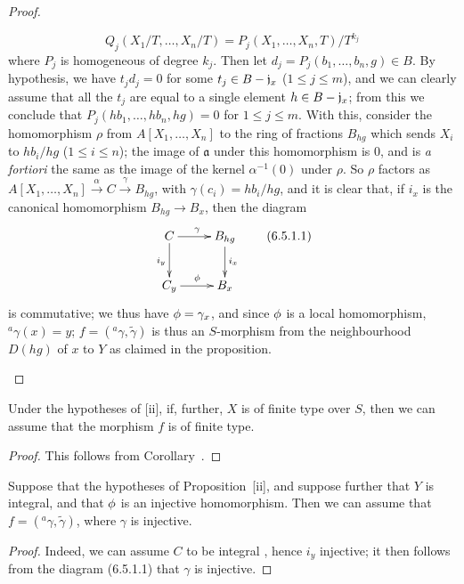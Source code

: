 \begin{proof}
\begin{enumerate}
    \[
      Q_j(X_1/T,\ldots,X_n/T)=P_j(X_1,\ldots,X_n,T)/T^{k_j}
    \]
    where $P_j$ is homogeneous of degree $k_j$.
    Then let $d_j=P_j(b_1,\ldots,b_n,g)\in B$.
    By hypothesis, we have $t_jd_j=0$ for some $t_j\in B-\mathfrak{j}_x$ ($1\leq j\leq m$), and we can clearly assume that all the $t_j$ are equal to a single element $h\in B-\mathfrak{j}_x$;
    from this we conclude that $P_j(hb_1,\ldots,hb_n,hg)=0$ for $1\leq j\leq m$.
    With this, consider the homomorphism $\rho$ from $A[X_1,\ldots,X_n]$ to the ring of fractions $B_{hg}$ which sends $X_i$ to $hb_i/hg$ ($1\leq i\leq n$);
    the image of $\mathfrak{a}$ under this homomorphism is $0$, and is \emph{a fortiori} the same as the image of the kernel $\alpha^{-1}(0)$ under $\rho$.
    So $\rho$ factors as $A[X_1,\ldots,X_n]\xrightarrow{\alpha}C\xrightarrow{\gamma}B_{hg}$, with $\gamma(c_i)=hb_i/hg$, and it is clear that, if $i_x$ is the canonical homomorphism $B_{hg}\to B_x$, then the diagram
    \[
    \label{I.6.5.1.1}
      \xymatrix{
        C\ar[r]^\gamma\ar[d]_{i_y} &
        B_{hg}\ar[d]^{i_x}\\
        C_y\ar[r]^\vphi &
        B_x
      }
      \tag{6.5.1.1}
    \]
    is commutative; we thus have $\phi=\gamma_x$, and since $\phi$ is a local homomorphism, $^a\gamma(x)=y$;
    $f=({}^a\gamma,\widetilde{\gamma})$ is thus an $S$-morphism from the neighbourhood $D(hg)$ of $x$ to $Y$ as claimed in the proposition.
\end{enumerate}
\end{proof}

\begin{corollary}[6.5.2]
\label{I.6.5.2}
Under the hypotheses of [ii], if, further, $X$ is of finite type over $S$, then we can assume that the morphism $f$ is of finite type.
\end{corollary}

\begin{proof}
\label{proof-I.6.5.2}
This follows from Corollary~.
\end{proof}

\begin{corollary}[6.5.3]
\label{I.6.5.3}
Suppose that the hypotheses of Proposition~[ii], and suppose further that $Y$ is integral, and that $\phi$ is an injective homomorphism.
Then we can assume that $f=({}^a\gamma,\widetilde{\gamma})$, where $\gamma$ is injective.
\end{corollary}

\begin{proof}
\label{proof-I.6.5.3}
Indeed, we can assume $C$ to be integral , hence $i_y$ injective; it then follows from the diagram (6.5.1.1) that $\gamma$ is injective.
\end{proof}

